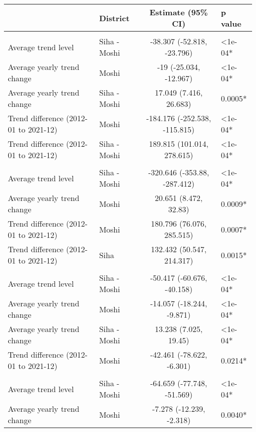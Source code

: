 \begingroup
\fontsize{12.0pt}{14.4pt}\selectfont
\begin{longtable}{l|lcl}
\toprule
 & District & Estimate (95\% CI) & p value \\ 
\midrule\addlinespace[2.5pt]
\multicolumn{4}{l}{Chronic Respiratory Disease} \\[2.5pt] 
\midrule\addlinespace[2.5pt]
Average trend level & Siha - Moshi & -38.307 (-52.818, -23.796) & <1e-04* \\ 
Average yearly trend change & Moshi & -19 (-25.034, -12.967) & <1e-04* \\ 
Average yearly trend change & Siha - Moshi & 17.049 (7.416, 26.683) & 0.0005* \\ 
Trend difference (2012-01 to 2021-12) & Moshi & -184.176 (-252.538, -115.815) & <1e-04* \\ 
Trend difference (2012-01 to 2021-12) & Siha - Moshi & 189.815 (101.014, 278.615) & <1e-04* \\ 
\midrule\addlinespace[2.5pt]
\multicolumn{4}{l}{Diabetes Mellitus} \\[2.5pt] 
\midrule\addlinespace[2.5pt]
Average trend level & Siha - Moshi & -320.646 (-353.88, -287.412) & <1e-04* \\ 
Average yearly trend change & Moshi & 20.651 (8.472, 32.83) & 0.0009* \\ 
Trend difference (2012-01 to 2021-12) & Moshi & 180.796 (76.076, 285.515) & 0.0007* \\ 
Trend difference (2012-01 to 2021-12) & Siha & 132.432 (50.547, 214.317) & 0.0015* \\ 
\midrule\addlinespace[2.5pt]
\multicolumn{4}{l}{Epilepsy} \\[2.5pt] 
\midrule\addlinespace[2.5pt]
Average trend level & Siha - Moshi & -50.417 (-60.676, -40.158) & <1e-04* \\ 
Average yearly trend change & Moshi & -14.057 (-18.244, -9.871) & <1e-04* \\ 
Average yearly trend change & Siha - Moshi & 13.238 (7.025, 19.45) & <1e-04* \\ 
Trend difference (2012-01 to 2021-12) & Moshi & -42.461 (-78.622, -6.301) & 0.0214* \\ 
\midrule\addlinespace[2.5pt]
\multicolumn{4}{l}{Fractures} \\[2.5pt] 
\midrule\addlinespace[2.5pt]
Average trend level & Siha - Moshi & -64.659 (-77.748, -51.569) & <1e-04* \\ 
Average yearly trend change & Moshi & -7.278 (-12.239, -2.318) & 0.0040* \\ 

\end{longtable}
